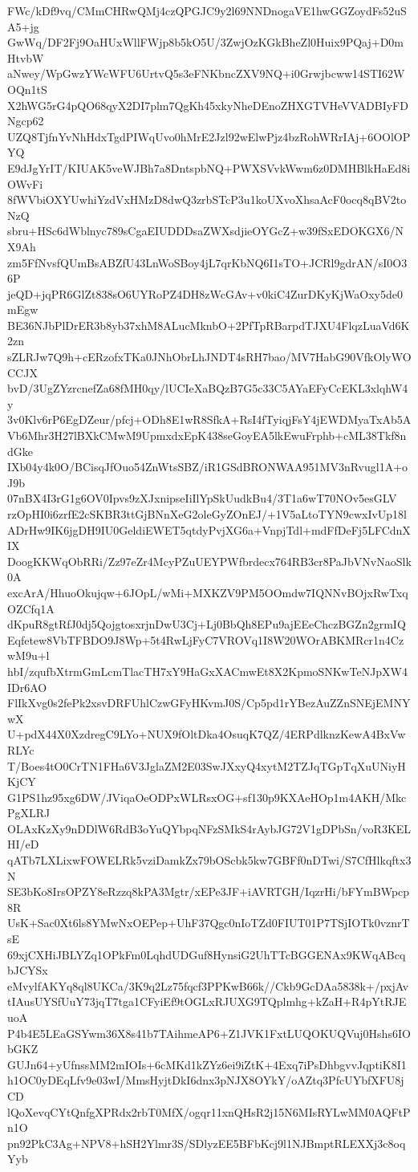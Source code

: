 FWc/kDf9vq/CMmCHRwQMj4czQPGJC9y2l69NNDnogaVE1hwGGZoydFs52uSA5+jg
GwWq/DF2Fj9OaHUxWllFWjp8b5kO5U/3ZwjOzKGkBheZl0Huix9PQaj+D0mHtvbW
aNwey/WpGwzYWcWFU6UrtvQ5s3eFNKbncZXV9NQ+i0Grwjbcww14STI62WOQn1tS
X2hWG5rG4pQO68qyX2DI7plm7QgKh45xkyNheDEnoZHXGTVHeVVADBIyFDNgcp62
UZQ8TjfnYvNhHdxTgdPIWqUvo0hMrE2Jzl92wElwPjz4bzRohWRrIAj+6OOlOPYQ
E9dJgYrIT/KIUAK5veWJBh7a8DntspbNQ+PWXSVvkWwm6z0DMHBlkHaEd8iOWvFi
8fWVbiOXYUwhiYzdVxHMzD8dwQ3zrbSTcP3u1koUXvoXhsaAcF0ocq8qBV2toNzQ
sbru+HSc6dWblnyc789sCgaEIUDDDsaZWXsdjieOYGcZ+w39fSxEDOKGX6/NX9Ah
zm5FfNvsfQUmBsABZfU43LnWoSBoy4jL7qrKbNQ6I1sTO+JCRl9gdrAN/sI0O36P
jeQD+jqPR6GlZt838sO6UYRoPZ4DH8zWcGAv+v0kiC4ZurDKyKjWaOxy5de0mEgw
BE36NJbPlDrER3b8yb37xhM8ALucMknbO+2PfTpRBarpdTJXU4FlqzLuaVd6K2zn
sZLRJw7Q9h+cERzofxTKa0JNhObrLhJNDT4sRH7bao/MV7HabG90VfkOlyWOCCJX
bvD/3UgZYzrcnefZa68fMH0qy/lUCIeXaBQzB7G5c33C5AYaEFyCcEKL3xlqhW4y
3v0Klv6rP6EgDZeur/pfcj+ODh8E1wR8SfkA+RsI4fTyiqjFsY4jEWDMyaTxAb5A
Vb6Mhr3H27lBXkCMwM9UpmxdxEpK438seGoyEA5lkEwuFrphb+cML38Tkf8ndGke
IXb04y4k0O/BCisqJfOuo54ZnWtsSBZ/iR1GSdBRONWAA951MV3nRvugl1A+oJ9b
07nBX4I3rG1g6OV0Ipvs9zXJxnipseIiIlYpSkUudkBu4/3T1a6wT70NOv5esGLV
rzOpHI0i6zrfE2cSKBR3ttGjBNnXeG2oleGyZOnEJ/+1V5aLtoTYN9cwxIvUp18l
ADrHw9IK6jgDH9IU0GeldiEWET5qtdyPvjXG6a+VnpjTdl+mdFfDeFj5LFCdnXIX
DoogKKWqObRRi/Zz97eZr4McyPZuUEYPWfbrdecx764RB3cr8PaJbVNvNaoSlk0A
excArA/HhuoOkujqw+6JOpL/wMi+MXKZV9PM5OOmdw7IQNNvBOjxRwTxqOZCfq1A
dKpuR8gtRfJ0dj5QojgtosxrjnDwU3Cj+Lj0BbQh8EPu9ajEEeChczBGZn2grmIQ
Eqfetew8VbTFBDO9J8Wp+5t4RwLjFyC7VROVq1I8W20WOrABKMRcr1n4CzwM9u+l
hbI/zqufbXtrmGmLcmTlacTH7xY9HaGxXACmwEt8X2KpmoSNKwTeNJpXW4IDr6AO
FlIkXvg0s2fePk2xsvDRFUhlCzwGFyHKvmJ0S/Cp5pd1rYBezAuZZnSNEjEMNYwX
U+pdX44X0XzdregC9LYo+NUX9fOltDka4OsuqK7QZ/4ERPdlknzKewA4BxVwRLYc
T/Boes4tO0CrTN1FHa6V3JglaZM2E03SwJXxyQ4xytM2TZJqTGpTqXuUNiyHKjCY
G1PS1hz95xg6DW/JViqaOeODPxWLRsxOG+sf130p9KXAeHOp1m4AKH/MkcPgXLRJ
OLAxKzXy9nDDlW6RdB3oYuQYbpqNFzSMkS4rAybJG72V1gDPbSn/voR3KELHI/eD
qATb7LXLixwFOWELRk5vziDamkZx79bOScbk5kw7GBFf0nDTwi/S7CfHlkqftx3N
SE3bKo8IrsOPZY8eRzzq8kPA3Mgtr/xEPe3JF+iAVRTGH/IqzrHi/bFYmBWpcp8R
UsK+Sac0Xt6ls8YMwNxOEPep+UhF37Qgc0nIoTZd0FIUT01P7TSjIOTk0vznrTsE
69xjCXHiJBLYZq1OPkFm0LqhdUDGuf8HynsiG2UhTTcBGGENAx9KWqABcqbJCYSx
eMvylfAKYq8ql8UKCa/3K9q2Lz75fqcf3PPKwB66k//Ckb9GcDAa5838k+/pxjAv
tIAusUYSfUuY73jqT7tga1CFyiEf9tOGLxRJUXG9TQplmhg+kZaH+R4pYtRJEuoA
P4b4E5LEaGSYwm36X8s41b7TAihmeAP6+Z1JVK1FxtLUQOKUQVuj0Hshs6IObGKZ
GUJn64+yUfnssMM2mIOIs+6cMKd1kZYz6ei9iZtK+4Exq7iPsDhbgvvJqptiK8I1
h1OC0yDEqLfv9e03wI/MmsHyjtDkI6dnx3pNJX8OYkY/oAZtq3PfcUYbfXFU8jCD
lQoXevqCYtQnfgXPRdx2rbT0MfX/ogqr11xnQHsR2j15N6MIsRYLwMM0AQFtPn1O
pn92PkC3Ag+NPV8+hSH2Ylmr3S/SDlyzEE5BFbKcj9l1NJBmptRLEXXj3c8oqYyb
